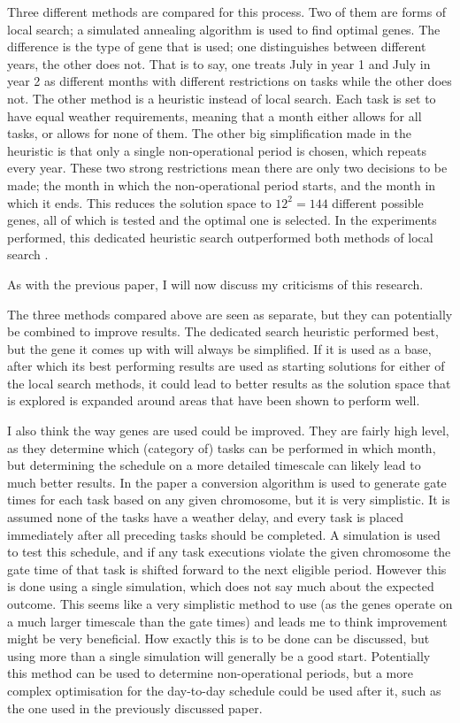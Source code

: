 \documentclass[a4paper,12pt]{article}
\begin{document}
Three different methods are compared for this process. Two of them are forms of local search; a simulated annealing algorithm is used to find optimal genes. The difference is the type of gene that is used; one distinguishes between different years, the other does not. That is to say, one treats July in year 1 and July in year 2 as different months with different restrictions on tasks while the other does not. The other method is a heuristic instead of local search. Each task is set to have equal weather requirements, meaning that a month either allows for all tasks, or allows for none of them. The other big simplification made in the heuristic is that only a single non-operational period is chosen, which repeats every year. These two strong restrictions mean there are only two decisions to be made; the month in which the non-operational period starts, and the month in which it ends. This reduces the solution space to $12^2 = 144$ different possible genes, all of which is tested and the optimal one is selected. In the experiments performed, this dedicated heuristic search outperformed both methods of local search . 

\bigskip

As with the previous paper, I will now discuss my criticisms of this research. 

The three methods compared above are seen as separate, but they can potentially be combined to improve results. The dedicated search heuristic performed best, but the gene it comes up with will always be simplified. If it is used as a base, after which its best performing results are used as starting solutions for either of the local search methods, it could lead to better results as the solution space that is explored is expanded around areas that have been shown to perform well. 

I also think the way genes are used could be improved. They are fairly high level, as they determine which (category of) tasks can be performed in which month, but determining the schedule on a more detailed timescale can likely lead to much better results. In the paper a conversion algorithm is used to generate gate times for each task based on any given chromosome, but it is very simplistic. It is assumed none of the tasks have a weather delay, and every task is placed immediately after all preceding tasks should be completed. A simulation is used to test this schedule, and if any task executions violate the given chromosome the gate time of that task is shifted forward to the next eligible period. However this is done using a single simulation, which does not say much about the expected outcome. This seems like a very simplistic method to use (as the genes operate on a much larger timescale than the gate times) and leads me to think improvement might be very beneficial. How exactly this is to be done can be discussed, but using more than a single simulation will generally be a good start. Potentially this method can be used to determine non-operational periods, but a more complex optimisation for the day-to-day schedule could be used after it, such as the one used in the previously discussed paper. 
\end{document}
